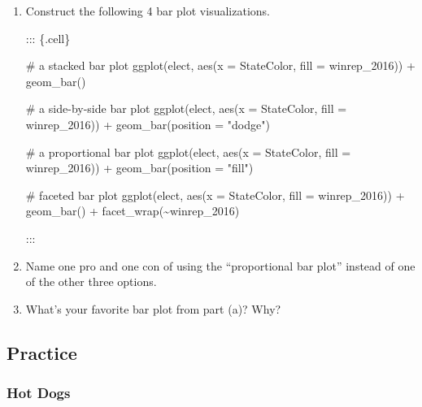 \documentclass[
  letterpaper,
  DIV=11,
  numbers=noendperiod]{scrreprt}
\newenvironment{Shaded}{\begin{snugshade}}{\end{snugshade}}
\newcommand{\AttributeTok}[1]{\textcolor[rgb]{0.40,0.45,0.13}{#1}}
\newcommand{\CommentTok}[1]{\textcolor[rgb]{0.37,0.37,0.37}{#1}}
\newcommand{\FunctionTok}[1]{\textcolor[rgb]{0.28,0.35,0.67}{#1}}
\newcommand{\NormalTok}[1]{\textcolor[rgb]{0.00,0.23,0.31}{#1}}
\newcommand{\SpecialCharTok}[1]{\textcolor[rgb]{0.37,0.37,0.37}{#1}}
\newcommand{\StringTok}[1]{\textcolor[rgb]{0.13,0.47,0.30}{#1}}
\begin{document}
\begin{enumerate}
\def\labelenumi{\alph{enumi}.}
\item
  Construct the following 4 bar plot visualizations.

  ::: \{.cell\}

\begin{Shaded}
\begin{Highlighting}[]
\CommentTok{\# a stacked bar plot}
\FunctionTok{ggplot}\NormalTok{(elect, }\FunctionTok{aes}\NormalTok{(}\AttributeTok{x =}\NormalTok{ StateColor, }\AttributeTok{fill =}\NormalTok{ winrep\_2016)) }\SpecialCharTok{+}
  \FunctionTok{geom\_bar}\NormalTok{()}

\CommentTok{\# a side{-}by{-}side bar plot}
\FunctionTok{ggplot}\NormalTok{(elect, }\FunctionTok{aes}\NormalTok{(}\AttributeTok{x =}\NormalTok{ StateColor, }\AttributeTok{fill =}\NormalTok{ winrep\_2016)) }\SpecialCharTok{+}
  \FunctionTok{geom\_bar}\NormalTok{(}\AttributeTok{position =} \StringTok{"dodge"}\NormalTok{)}

\CommentTok{\# a proportional bar plot}
\FunctionTok{ggplot}\NormalTok{(elect, }\FunctionTok{aes}\NormalTok{(}\AttributeTok{x =}\NormalTok{ StateColor, }\AttributeTok{fill =}\NormalTok{ winrep\_2016)) }\SpecialCharTok{+}
  \FunctionTok{geom\_bar}\NormalTok{(}\AttributeTok{position =} \StringTok{"fill"}\NormalTok{)}

\CommentTok{\# faceted bar plot}
\FunctionTok{ggplot}\NormalTok{(elect, }\FunctionTok{aes}\NormalTok{(}\AttributeTok{x =}\NormalTok{ StateColor, }\AttributeTok{fill =}\NormalTok{ winrep\_2016)) }\SpecialCharTok{+}
  \FunctionTok{geom\_bar}\NormalTok{() }\SpecialCharTok{+}
  \FunctionTok{facet\_wrap}\NormalTok{(}\SpecialCharTok{\textasciitilde{}}\NormalTok{winrep\_2016)}
\end{Highlighting}
\end{Shaded}

  :::
\item
  Name one pro and one con of using the ``proportional bar plot''
  instead of one of the other three options.
\item
  What's your favorite bar plot from part (a)? Why?
\end{enumerate}

\subsection*{Practice}\label{practice-3}

\subsubsection*{Hot Dogs}\label{hot-dogs}
\end{document}
